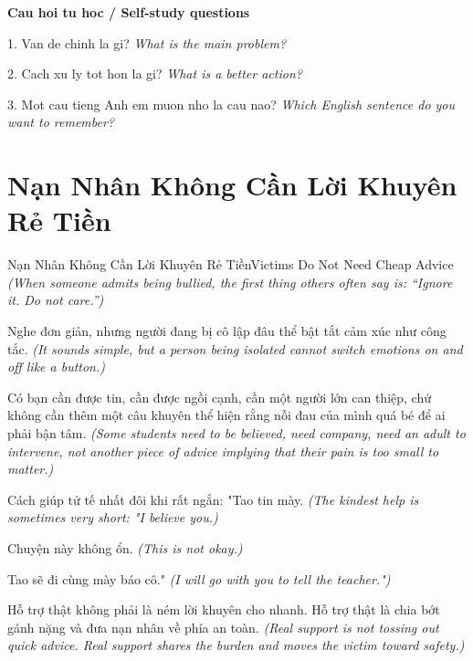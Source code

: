 \begin{tuhocnhanh}
\textbf{Cau hoi tu hoc / Self-study questions}

1. Van de chinh la gi? \textit{What is the main problem?}

2. Cach xu ly tot hon la gi? \textit{What is a better action?}

3. Mot cau tieng Anh em muon nho la cau nao? \textit{Which English sentence do you want to remember?}
\end{tuhocnhanh}
\ngancach

\section{Nạn Nhân Không Cần Lời Khuyên Rẻ Tiền}
\begin{truyen}{Nạn Nhân Không Cần Lời Khuyên Rẻ Tiền}{Victims Do Not Need Cheap Advice}
\textit{(When someone admits being bullied, the first thing others often say is: ``Ignore it. Do not care.'')}

Nghe đơn giản, nhưng người đang bị cô lập đâu thể bật tắt cảm xúc như công tắc.
\textit{(It sounds simple, but a person being isolated cannot switch emotions on and off like a button.)}

Có bạn cần được tin, cần được ngồi cạnh, cần một người lớn can thiệp, chứ không cần thêm một câu khuyên thể hiện rằng nỗi đau của mình quá bé để ai phải bận tâm.
\textit{(Some students need to be believed, need company, need an adult to intervene, not another piece of advice implying that their pain is too small to matter.)}

Cách giúp tử tế nhất đôi khi rất ngắn: "Tao tin mày.
\textit{(The kindest help is sometimes very short: "I believe you.)}

Chuyện này không ổn.
\textit{(This is not okay.)}

Tao sẽ đi cùng mày báo cô."
\textit{(I will go with you to tell the teacher.")}

\end{truyen}

\begin{baihoc}
Hỗ trợ thật không phải là ném lời khuyên cho nhanh. Hỗ trợ thật là chia bớt gánh nặng và đưa nạn nhân về phía an toàn.
\textit{(Real support is not tossing out quick advice. Real support shares the burden and moves the victim toward safety.)}
\end{baihoc}

